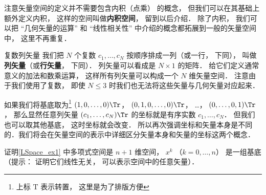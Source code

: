 注意矢量空间的定义并不需要包含内积（点乘） 的概念， 但我们可以在其基础上额外定义内积， 这样的空间叫做\textbf{内积空间}， 留到以后介绍． 除了内积， 我们可以把 “几何矢量的运算” 和 “线性相关性” 中介绍的概念都拓展到一般的矢量空间中， 这里不再重复．

\begin{exercise}{复数列矢量}
我们把 $N$ 个复数 $c_1, \dots, c_N$ 按顺序排成一列（或一行， 下同）， 叫做\textbf{列矢量}（或\textbf{行矢量}， 下同）． 列矢量可以看成是 $N \times 1$ 的矩阵． 给它们定义通常意义的加法和数乘运算， 这样所有列矢量可以构成一个 $N$ 维矢量空间． 注意由于我们使用了复数， 即使 $N \leqslant 3$ 时我们也无法将这些矢量与几何矢量对应起来．

如果我们将基底取为\footnote{上标 $\mathrm T$ 表示转置， 这里是为了排版方便} $(1, 0, \dots, 0)\Tr$， $(0, 1, 0, \dots, 0)\Tr$， …， $(0, \dots, 0, 1)\Tr$， 那么显然任意列矢量 $(c_1, \dots, c_N)\Tr$ 的坐标就是有序实数 $c_1, \dots, c_N$． 但我们也可以取其他基底， 这时坐标就会改变． 所以再次强调坐标和矢量本身是不同的．我们将会在矢量空间的表示中详细区分矢量本身和矢量的坐标这两个概念．
\end{exercise}

\begin{exercise}{}
证明\autoref{LSpace_ex1} 中多项式空间是 $n+1$ 维空间， $x^k$ （$k = 0, \dots, n$） 是一组基底（提示： 证明它们线性无关， 可以表示空间中的任意矢量）．
\end{exercise}





